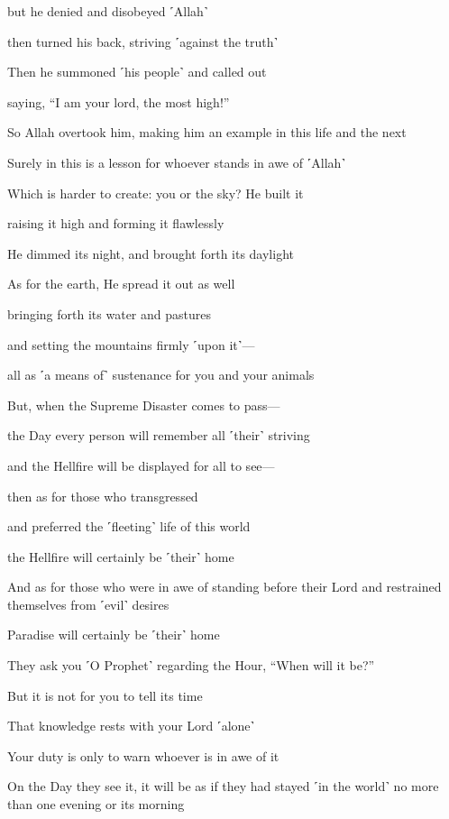 but he denied and disobeyed ˹Allah˺

then turned his back, striving ˹against the truth˺

Then he summoned ˹his people˺ and called out

saying, “I am your lord, the most high!”

So Allah overtook him, making him an example in this life and the next

Surely in this is a lesson for whoever stands in awe of ˹Allah˺

Which is harder to create: you or the sky? He built it

raising it high and forming it flawlessly

He dimmed its night, and brought forth its daylight

As for the earth, He spread it out as well

bringing forth its water and pastures

and setting the mountains firmly ˹upon it˺—

all as ˹a means of˺ sustenance for you and your animals

But, when the Supreme Disaster comes to pass—

the Day every person will remember all ˹their˺ striving

and the Hellfire will be displayed for all to see—

then as for those who transgressed

and preferred the ˹fleeting˺ life of this world

the Hellfire will certainly be ˹their˺ home

And as for those who were in awe of standing before their Lord and restrained themselves from ˹evil˺ desires

Paradise will certainly be ˹their˺ home

They ask you ˹O Prophet˺ regarding the Hour, “When will it be?”

But it is not for you to tell its time

That knowledge rests with your Lord ˹alone˺

Your duty is only to warn whoever is in awe of it

On the Day they see it, it will be as if they had stayed ˹in the world˺ no more than one evening or its morning

